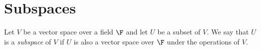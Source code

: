 \section{Subspaces}

\begin{definition}[Subspace]
	Let $V$ be a vector space over a field $\F$ and let $U$ be a subset of $V$. We say that $U$ is a \textit{subspace} of $V$ if $U$ is also a vector space over $\F$ under the operations of $V$.
\end{definition}
